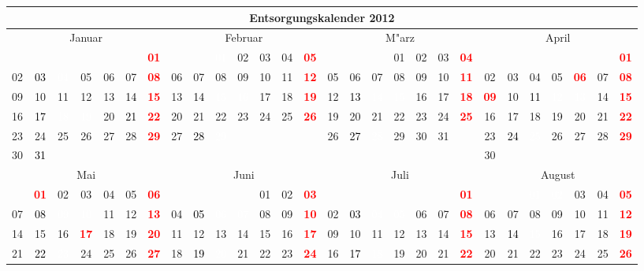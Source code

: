 \documentclass[10pt,a4paper,landscape]{article}
\newcommand{\bb}[1]{\cellcolor{MidnightBlue}\textcolor{white}{#1}}
\newcommand{\gb}[1]{\cellcolor{SpringGreen}\textcolor{black}{#1}}
\newcommand{\yb}[1]{\cellcolor{yellow}\textcolor{black}{#1}}
\newcommand{\ob}[1]{\cellcolor{Orange}\textcolor{white}{#1}}
\newcommand{\rb}[1]{\textbf{\textcolor{red}{#1}}}
\begin{document}
\begin{tabular}{|ccccccc|ccccccc|ccccccc|ccccccc|}
\hline
\multicolumn{28}{|c|}{\textbf{Entsorgungskalender 2012}} \\\hline
\multicolumn{7}{|c|}{Januar} & \multicolumn{7}{|c|}{Februar} & \multicolumn{7}{|c|}{M"arz} & \multicolumn{7}{|c|}{April} \\
   &    &    &    &    &    & \rb{01} &    &    & \ob{01} & 02 & 03 & 04 & \rb{05} &    &    &    & 01 & 02 & 03 & \rb{04} &    &    &    &    &    &    & \rb{01} \\
02 & \yb{03} & \ob{04} & 05 & 06 & 07 & \rb{08} & 06 & 07 & 08 & 09 & 10 & 11 & \rb{12} & 05 & 06 & 07 & 08 & 09 & 10 & \rb{11} & 02 & 03 & 04 & 05 & \rb{06} & 07 & \rb{08} \\
09 & 10 & 11 & 12 & 13 & \gb{14} & \rb{15} & 13 & \yb{14} & \ob{15} & \bb{16} & 17 & 18 & \rb{19} & 12 & \yb{13} & \ob{14} & \bb{15} & 16 & 17 & \rb{18} & \rb{09} & 10 & \yb{11} & \ob{12} & \bb{13} & 14 & \rb{15} \\
16 & \yb{17} & \ob{18} & \bb{19} & 20 & \gb{21} & \rb{22} & 20 & 21 & 22 & 23 & 24 & 25 & \rb{26} & 19 & 20 & 21 & 22 & 23 & 24 & \rb{25} & 16 & 17 & 18 & 19 & 20 & 21 & \rb{22} \\
23 & 24 & 25 & 26 & 27 & 28 & \rb{29} & 27 & \yb{28} & \ob{29} &    &    &    &    & 26 & \yb{27} & \ob{28} & 29 & 30 & 31 &    & 23 & \yb{24} & \ob{25} & 26 & 27 & 28 & \rb{29} \\
30 & \yb{31} &    &    &    &    &    &    &    &    &    &    &    &    &    &    &    &    &    &    &    & 30 &    &    &    &    &    &    \\\hline
\multicolumn{7}{|c|}{Mai} & \multicolumn{7}{|c|}{Juni} & \multicolumn{7}{|c|}{Juli} & \multicolumn{7}{|c|}{August} \\
   & \rb{01} & 02 & 03 & 04 & 05 & \rb{06} &    &    &    &    & 01 & 02 & \rb{03} &    &    &    &    &    &    & \rb{01} &    &    & \ob{01} & \bb{02} & 03 & 04 & \rb{05} \\
07 & \yb{08} & \ob{09} & \bb{10} & 11 & 12 & \rb{13} & 04 & \yb{05} & \ob{06} & \bb{07} & 08 & 09 & \rb{10} & 02 & \yb{03} & \ob{04} & \bb{05} & 06 & 07 & \rb{08} & 06 & 07 & 08 & 09 & 10 & 11 & \rb{12} \\
14 & 15 & 16 & \rb{17} & 18 & 19 & \rb{20} & 11 & 12 & 13 & 14 & 15 & 16 & \rb{17} & 09 & 10 & 11 & 12 & 13 & 14 & \rb{15} & 13 & \yb{14} & \ob{15} & 16 & 17 & 18 & \rb{19} \\
21 & \yb{22} & \ob{23} & 24 & 25 & 26 & \rb{27} & 18 & \yb{19} & \ob{20} & 21 & 22 & 23 & \rb{24} & 16 & \yb{17} & \ob{18} & 19 & 20 & 21 & \rb{22} & 20 & 21 & 22 & 23 & 24 & 25 & \rb{26} \\

\end{tabular}
\end{document}
